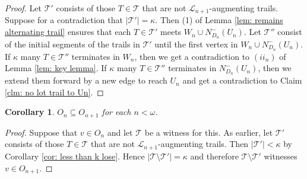 \documentclass[12pt,a4paper]{amsart}
\theoremstyle{plain}
\newtheorem{corollary}[theorem]{Corollary}
\theoremstyle{definition}
\begin{document}
\begin{proof}
 Let $ 
\mathcal{T}' $ consists of those $ T\in \mathcal{T} $  that are not $ \mathcal{L}_{n+1} $-augmenting trails. Suppose for a 
contradiction that $ \left|\mathcal{T}'\right|=\kappa $.  Then  (1) of Lemma \ref{lem: remains alternating trail} ensures that each $T\in 
\mathcal{T}' $ meets  $ W_n \cup N_{D_{n}}^{-}(U_n) $. Let $ \mathcal{T}'' $ consist of the initial segments of the trails in $ \mathcal{T}' $ 
until the first vertex in $ W_n \cup N_{D_{n}}^{-}(U_n) $. If $ \kappa $ many $ T\in \mathcal{T}'' $ terminates in $ W_n $, then we get a 
contradiction to $ (ii_n) $ of Lemma \ref{lem: key lemma}. If $ \kappa $ many $ T\in \mathcal{T}'' $ terminates in $ N_{D_{n}}^{-}(U_n) $, 
then we extend them forward by a new edge to reach $ U_n $ and get a contradiction to Claim \ref{clm: no lot trail to Un}.
\end{proof}
\begin{corollary}\label{cor: On grows}
$ O_n\subseteq O_{n+1} $ for each $ n<\omega $.
\end{corollary}
\begin{proof}
Suppose that  $v\in  O_n $ and let $ \mathcal{T} $ be a witness for this. As earlier, let $\mathcal{T}' $ consists of those $ 
T\in \mathcal{T} $  that are not $ \mathcal{L}_{n+1} $-augmenting trails. Then $ \left|\mathcal{T}'\right|<\kappa $ by 
Corollary \ref{cor: less than k lose}. Hence $ \left|\mathcal{T}\setminus \mathcal{T}'\right|=\kappa $ and therefore $ 
\mathcal{T}\setminus \mathcal{T}' $ witnesses $ v\in O_{n+1} $.
\end{proof}
\end{document}
